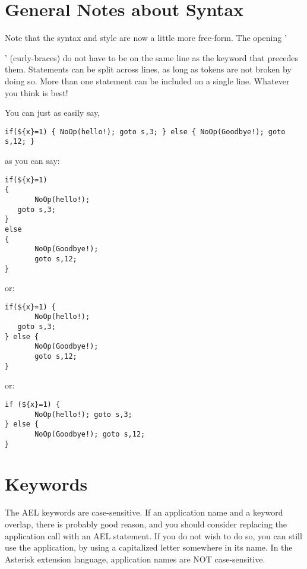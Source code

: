 \section{General Notes about Syntax}

Note that the syntax and style are now a little more free-form. The
opening '{' (curly-braces) do not have to be on the same line as the
keyword that precedes them. Statements can be split across lines, as
long as tokens are not broken by doing so. More than one statement can
be included on a single line. Whatever you think is best!

You can just as easily say,

\begin{verbatim}
if(${x}=1) { NoOp(hello!); goto s,3; } else { NoOp(Goodbye!); goto s,12; }
\end{verbatim}

as you can say:

\begin{verbatim}
if(${x}=1)
{
       NoOp(hello!);
   goto s,3;
}
else
{
       NoOp(Goodbye!);
       goto s,12;
}
\end{verbatim}

or:

\begin{verbatim}
if(${x}=1) {
       NoOp(hello!);
   goto s,3;
} else {
       NoOp(Goodbye!);
       goto s,12;
}
\end{verbatim}

or:

\begin{verbatim}
if (${x}=1) {
       NoOp(hello!); goto s,3;
} else {
       NoOp(Goodbye!); goto s,12;
}
\end{verbatim}

\section{Keywords}

The AEL keywords are case-sensitive. If an application name and a
keyword overlap, there is probably good reason, and you should
consider replacing the application call with an AEL statement. If you
do not wish to do so, you can still use the application, by using a
capitalized letter somewhere in its name. In the Asterisk extension
language, application names are NOT case-sensitive.

}
